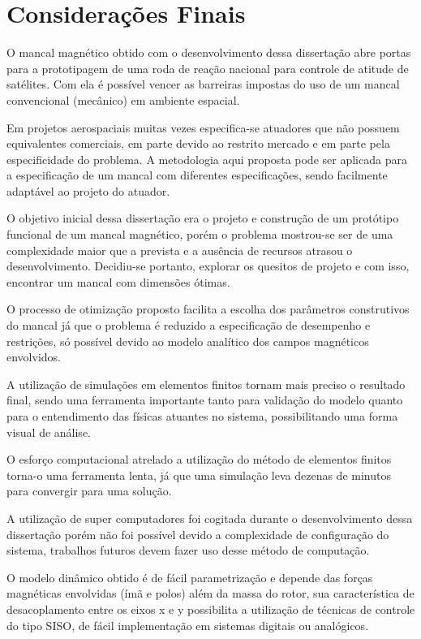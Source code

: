 \pagestyle{empty}
	\cleardoublepage
\pagestyle{fancy}

\chapter{Considerações Finais} \label{Cap:Consideracoes:Finais}

O mancal magnético obtido com o desenvolvimento dessa dissertação abre portas para a prototipagem de uma roda de reação nacional para controle de atitude de satélites. Com ela é possível vencer as barreiras impostas do uso de um mancal convencional (mecânico) em ambiente espacial.

Em projetos aerospaciais muitas vezes especifica-se atuadores que não possuem equivalentes comerciais, em parte devido ao restrito mercado e em parte pela especificidade do problema. A metodologia aqui proposta pode ser aplicada para a especificação de um mancal com diferentes especificações, sendo facilmente adaptável ao projeto do atuador.

O objetivo inicial dessa dissertação era o projeto e construção de um protótipo funcional de um mancal magnético, porém o problema mostrou-se ser de uma complexidade maior que a prevista e a ausência de recursos atrasou o desenvolvimento. Decidiu-se portanto, explorar os quesitos de projeto e com isso, encontrar  um mancal com dimensões ótimas. 

O processo de otimização proposto facilita a escolha dos parâmetros construtivos do mancal já que o problema é reduzido a especificação de desempenho e restrições, só possível devido ao modelo analítico dos campos magnéticos envolvidos.

A utilização de simulações em elementos finitos tornam mais preciso o resultado final, sendo uma ferramenta importante tanto para validação do modelo quanto para o entendimento das físicas atuantes no sistema, possibilitando uma forma visual de análise. 

O esforço computacional atrelado a utilização do método de elementos finitos torna-o uma ferramenta lenta, já que uma simulação leva dezenas de minutos para convergir para uma solução.

A utilização de super computadores foi cogitada durante o desenvolvimento dessa dissertação porém não foi possível devido a complexidade de configuração do sistema, trabalhos futuros devem fazer uso desse método de computação.

O modelo dinâmico obtido é de fácil parametrização e depende das forças magnéticas envolvidas (ímã e polos) além da massa do rotor, sua característica de desacoplamento entre os eixos x e y possibilita a utilização de técnicas de controle do tipo SISO, de fácil implementação em sistemas digitais ou analógicos.

